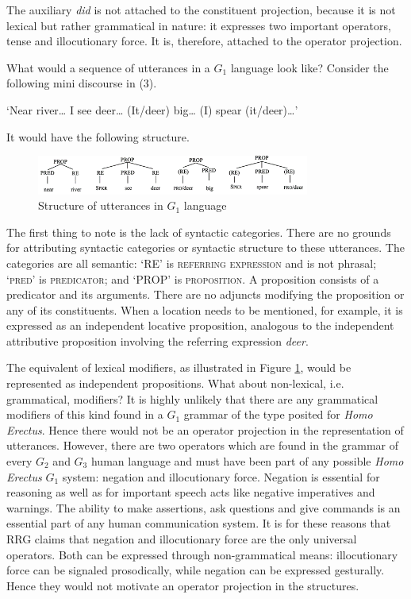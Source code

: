 \documentclass[output=paper,colorlinks,citecolor=brown]{langscibook}
\begin{document}
The auxiliary \emph{did} is not attached to the constituent projection, because it is not lexical but  rather grammatical in nature: it expresses two important operators, tense and illocutionary force.  It is, therefore, attached to the operator projection.

What would a sequence of utterances in a $G_1$ language look like?  Consider the following mini discourse in (3).

\ea ‘Near river… I see deer… (It/deer) big… (I) spear (it/deer)…’\z

It would have the following structure.
\begin{figure}
\centering
\includegraphics[width=0.8\textwidth]{vanvalin_figure2.png}
\caption{\label{fig:fig2}Structure of utterances in $G_1$ language}
\end{figure}

The first thing to note is the lack of syntactic categories.  There are no grounds for attributing syntactic categories or syntactic structure to these utterances.  The categories are all semantic: ‘RE’ is \textsc{referring expression} and is not phrasal; ‘\textsc{pred}’ is \textsc{predicator}; and ‘PROP’ is \textsc{proposition}.  A proposition consists of a predicator and its arguments. There are no adjuncts modifying the proposition or any of its constituents.  When a location needs to be mentioned, for example, it is expressed as an independent locative proposition, analogous to the independent attributive proposition involving the referring expression \emph{deer}.  

The equivalent of lexical modifiers, as illustrated in Figure \ref{fig:fig2}, would be represented as independent propositions.  What about non-lexical, i.e. grammatical, modifiers?  It is highly unlikely that there are any grammatical modifiers of this kind found in a $G_1$ grammar of the type posited for \emph{Homo Erectus}.  Hence there would not be an operator projection in the representation of utterances.  However, there are two operators which are found in the grammar of every $G_2$ and $G_3$ human language and must have been part of any possible \emph{Homo Erectus} $G_1$ system: negation and illocutionary force. Negation is essential for reasoning as well as for important speech acts like negative imperatives and warnings.  The ability to make assertions, ask questions and give commands is an essential part of any human communication system.  It is for these reasons that RRG claims that negation and illocutionary force are the only universal operators.  Both can be expressed through non-grammatical means: illocutionary force can be signaled prosodically, while negation can be expressed gesturally.  Hence they would not motivate an operator projection in the structures.
\end{document}
